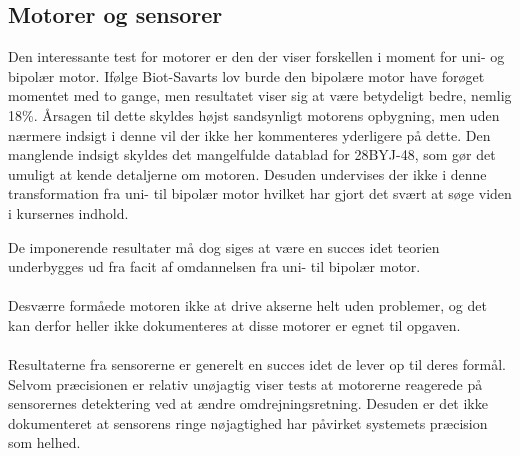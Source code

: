 \subsection{Motorer og sensorer}
\label{sec:HW_diskussion}
Den interessante test for motorer er den der viser forskellen i moment for uni- og bipolær motor. Ifølge Biot-Savarts lov burde den bipolære motor have forøget momentet med to gange, men resultatet viser sig at være betydeligt bedre, nemlig 18\%. Årsagen til dette skyldes højst sandsynligt motorens opbygning, men uden nærmere indsigt i denne vil der ikke her kommenteres yderligere på dette. Den manglende indsigt skyldes det mangelfulde datablad for 28BYJ-48, som gør det umuligt at kende detaljerne om motoren. Desuden undervises der ikke i denne transformation fra uni- til bipolær motor hvilket har gjort det svært at søge viden i kursernes indhold.

De imponerende resultater må dog siges at være en succes idet teorien underbygges ud fra facit af omdannelsen fra uni- til bipolær motor. 
\\
\\
Desværre formåede motoren ikke at drive akserne helt uden problemer, og det kan derfor heller ikke dokumenteres at disse motorer er egnet til opgaven.
\\
\\
Resultaterne fra sensorerne er generelt en succes idet de lever op til deres formål. Selvom præcisionen er relativ unøjagtig viser tests at motorerne reagerede på sensorernes detektering ved at ændre omdrejningsretning. Desuden er det ikke dokumenteret at sensorens ringe nøjagtighed har påvirket systemets præcision som helhed.